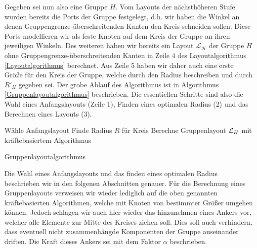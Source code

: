 
Gegeben sei nun also eine Gruppe $H$. Vom Layouts der nächsthöheren Stufe wurden bereits die Ports der Gruppe festgelegt, d.h. wir haben die Winkel an denen Gruppengrenze-überschreitenden Kanten den Kreis schneiden sollen. Diese Ports modellieren wir als feste Knoten auf dem Kreis der Gruppe an ihren jeweiligen Winkeln.
Des weiteren haben wir bereits ein Layout $\mathcal{L_H}$ der Gruppe $H$ ohne Gruppengrenze-überschreitenden Kanten in Zeile 4 des Layoutalgorithmus \ref{Layoutalgorithmus}  berechnet.
Aus Zeile 5 haben wir daher auch eine erste Größe für den Kreis der Gruppe, welche durch den Radius beschreiben und durch $R'_H$ gegeben sei. 
Der grobe Ablauf des Algorithmus ist in Algorithmus \ref{Gruppenlayoutalgorithmus} beschrieben. 
Die essentiellen Schritte sind also die Wahl eines Anfangslayouts (Zeile 1), Finden eines optimalen Radius (2) und das Berechnen eines Layouts (3).

\begin{algorithm}[H]
\label{Gruppenlayoutalgorithmus}
\SetAlgoLined
{} 
Wähle Anfangslayout\;
Finde Radius $R$ für Kreis\;
Berechne Gruppenlayout  $\mathcal{L}_H$ mit kräftebasiertem Algorithmus\;
\caption{Gruppenlayoutalgorithmus}
\end{algorithm}



Die Wahl eines Anfangslayouts und das finden eines optimalen Radius beschrieben wir  in den folgenen Abschnitten  genauer. 
Für die Berechnung eines Gruppenlayouts verweisen wir wieder lediglich auf die oben genannten kräftebasierten Algorithmen, welche mit Knoten von bestimmter Größer umgehen können. 
Jedoch schlagen wir auch hier wieder das hinzunehmen eines Ankers vor, welcher alle Elemente zur Mitte des Kreises ziehen soll.
 Dies soll auch verhindern, dass eventuell nicht zusammenhängde Komponenten der Gruppe auseinander driften. Die Kraft dieses Ankers sei mit dem Faktor $\alpha$ beschrieben. 

